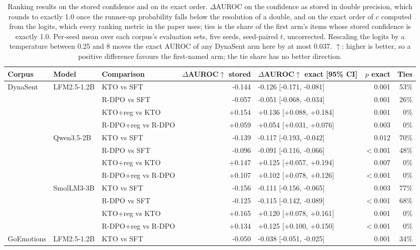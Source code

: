 \begin{table}[t]
\centering
\caption{Ranking results on the stored confidence and on its exact order. $\Delta$AUROC on the confidence as stored in double precision, which rounds to exactly 1.0 once the runner-up probability falls below the resolution of a double, and on the exact order of $c$ computed from the logits, which every ranking metric in the paper uses; ties is the share of the first arm's items whose stored confidence is exactly 1.0. Per-seed mean over each corpus's evaluation sets, five seeds, seed-paired $t$, uncorrected. Rescaling the logits by a temperature between 0.25 and 8 moves the exact AUROC of any DynaSent arm here by at most 0.037. $\uparrow$: higher is better, so a positive difference favours the first-named arm; the tie share has no better direction.}
\label{tab:exact-order}
\footnotesize
\setlength{\tabcolsep}{4pt}
\begin{tabular}{lllrlrr}
\toprule
Corpus & Model & Comparison & $\Delta$AUROC$\uparrow$ stored & $\Delta$AUROC$\uparrow$ exact [95\% CI] & $p$ exact & Ties \\
\midrule
DynaSent & LFM2.5-1.2B & KTO vs SFT & -0.144 & -0.126 [-0.171, -0.081] & 0.001 & 53\% \\
 &  & R-DPO vs SFT & -0.057 & -0.051 [-0.068, -0.034] & 0.001 & 26\% \\
 &  & KTO+reg vs KTO & +0.154 & +0.136 [+0.088, +0.184] & 0.001 & 0\% \\
 &  & R-DPO+reg vs R-DPO & +0.059 & +0.054 [+0.031, +0.076] & 0.003 & 0\% \\
 & Qwen3.5-2B & KTO vs SFT & -0.139 & -0.117 [-0.193, -0.042] & 0.012 & 70\% \\
 &  & R-DPO vs SFT & -0.096 & -0.091 [-0.116, -0.066] & $<$0.001 & 48\% \\
 &  & KTO+reg vs KTO & +0.147 & +0.125 [+0.057, +0.194] & 0.007 & 0\% \\
 &  & R-DPO+reg vs R-DPO & +0.107 & +0.102 [+0.078, +0.126] & $<$0.001 & 0\% \\
 & SmolLM3-3B & KTO vs SFT & -0.156 & -0.111 [-0.156, -0.065] & 0.003 & 77\% \\
 &  & R-DPO vs SFT & -0.125 & -0.115 [-0.142, -0.089] & $<$0.001 & 68\% \\
 &  & KTO+reg vs KTO & +0.165 & +0.120 [+0.078, +0.161] & 0.001 & 0\% \\
 &  & R-DPO+reg vs R-DPO & +0.134 & +0.125 [+0.100, +0.150] & $<$0.001 & 0\% \\
\addlinespace
GoEmotions & LFM2.5-1.2B & KTO vs SFT & -0.050 & -0.038 [-0.051, -0.025] & 0.001 & 34\% \\

\end{tabular}
\end{table}
